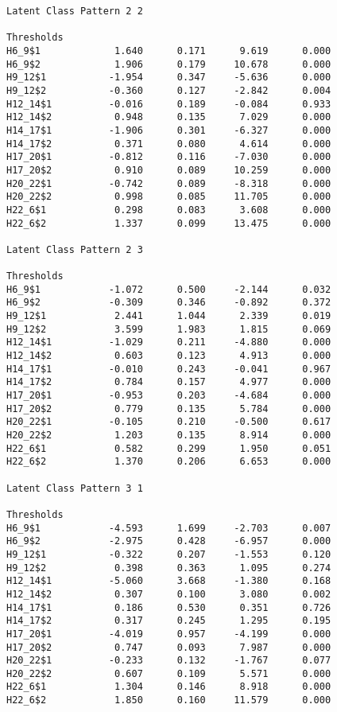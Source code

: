 \begin{verbatim}
Latent Class Pattern 2 2

Thresholds
H6_9$1             1.640      0.171      9.619      0.000
H6_9$2             1.906      0.179     10.678      0.000
H9_12$1           -1.954      0.347     -5.636      0.000
H9_12$2           -0.360      0.127     -2.842      0.004
H12_14$1          -0.016      0.189     -0.084      0.933
H12_14$2           0.948      0.135      7.029      0.000
H14_17$1          -1.906      0.301     -6.327      0.000
H14_17$2           0.371      0.080      4.614      0.000
H17_20$1          -0.812      0.116     -7.030      0.000
H17_20$2           0.910      0.089     10.259      0.000
H20_22$1          -0.742      0.089     -8.318      0.000
H20_22$2           0.998      0.085     11.705      0.000
H22_6$1            0.298      0.083      3.608      0.000
H22_6$2            1.337      0.099     13.475      0.000

Latent Class Pattern 2 3

Thresholds
H6_9$1            -1.072      0.500     -2.144      0.032
H6_9$2            -0.309      0.346     -0.892      0.372
H9_12$1            2.441      1.044      2.339      0.019
H9_12$2            3.599      1.983      1.815      0.069
H12_14$1          -1.029      0.211     -4.880      0.000
H12_14$2           0.603      0.123      4.913      0.000
H14_17$1          -0.010      0.243     -0.041      0.967
H14_17$2           0.784      0.157      4.977      0.000
H17_20$1          -0.953      0.203     -4.684      0.000
H17_20$2           0.779      0.135      5.784      0.000
H20_22$1          -0.105      0.210     -0.500      0.617
H20_22$2           1.203      0.135      8.914      0.000
H22_6$1            0.582      0.299      1.950      0.051
H22_6$2            1.370      0.206      6.653      0.000

Latent Class Pattern 3 1

Thresholds
H6_9$1            -4.593      1.699     -2.703      0.007
H6_9$2            -2.975      0.428     -6.957      0.000
H9_12$1           -0.322      0.207     -1.553      0.120
H9_12$2            0.398      0.363      1.095      0.274
H12_14$1          -5.060      3.668     -1.380      0.168
H12_14$2           0.307      0.100      3.080      0.002
H14_17$1           0.186      0.530      0.351      0.726
H14_17$2           0.317      0.245      1.295      0.195
H17_20$1          -4.019      0.957     -4.199      0.000
H17_20$2           0.747      0.093      7.987      0.000
H20_22$1          -0.233      0.132     -1.767      0.077
H20_22$2           0.607      0.109      5.571      0.000
H22_6$1            1.304      0.146      8.918      0.000
H22_6$2            1.850      0.160     11.579      0.000


\end{verbatim}
